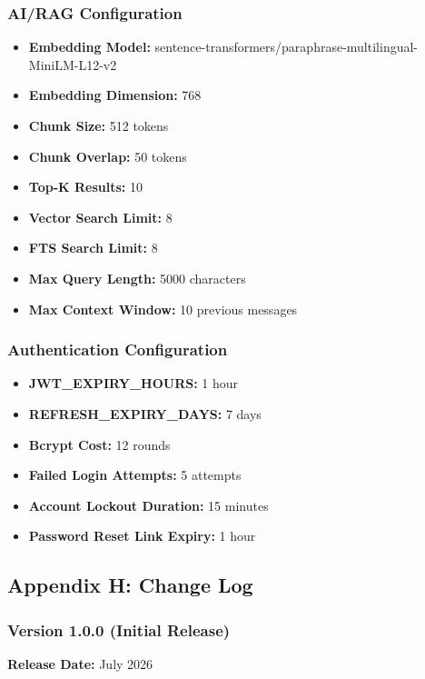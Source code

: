\documentclass[12pt,a4paper]{article}
\begin{document}
\subsubsection{AI/RAG Configuration}
\begin{itemize}[leftmargin=*]
    \item \textbf{Embedding Model:} sentence-transformers/paraphrase-multilingual-MiniLM-L12-v2
    \item \textbf{Embedding Dimension:} 768
    \item \textbf{Chunk Size:} 512 tokens
    \item \textbf{Chunk Overlap:} 50 tokens
    \item \textbf{Top-K Results:} 10
    \item \textbf{Vector Search Limit:} 8
    \item \textbf{FTS Search Limit:} 8
    \item \textbf{Max Query Length:} 5000 characters
    \item \textbf{Max Context Window:} 10 previous messages
\end{itemize}

\subsubsection{Authentication Configuration}
\begin{itemize}[leftmargin=*]
    \item \textbf{JWT\_EXPIRY\_HOURS:} 1 hour
    \item \textbf{REFRESH\_EXPIRY\_DAYS:} 7 days
    \item \textbf{Bcrypt Cost:} 12 rounds
    \item \textbf{Failed Login Attempts:} 5 attempts
    \item \textbf{Account Lockout Duration:} 15 minutes
    \item \textbf{Password Reset Link Expiry:} 1 hour
\end{itemize}

\newpage

\subsection{Appendix H: Change Log}

\subsubsection{Version 1.0.0 (Initial Release)}
\textbf{Release Date:} July 2026
\end{document}
